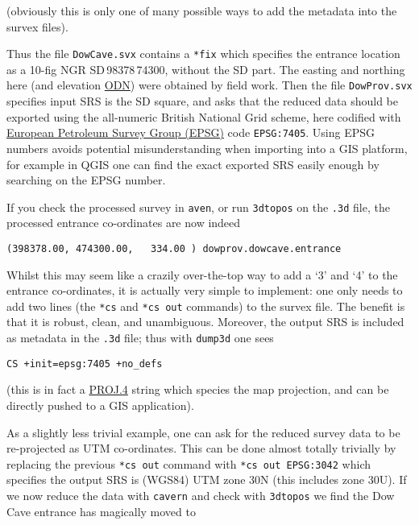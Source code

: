\documentclass[]{article}
\begin{document}
(obviously this is only one of many possible ways to add the metadata
into the survex files).

Thus the file \verb}DowCave.svx} contains a \verb}*fix} which
specifies the entrance location as a 10-fig NGR
SD\,98378\,74300, without the SD part. The easting and
northing here (and elevation
\href{https://en.wikipedia.org/wiki/Ordnance_datum}{ODN}) were obtained
by field work. Then the file \verb}DowProv.svx} specifies input SRS is
the SD square, and asks that the reduced data should be exported
using the all-numeric British National Grid scheme, here codified with 
\href{http://spatialreference.org/}{European Petroleum Survey Group
  (EPSG)} code \verb+EPSG:7405+.
Using EPSG numbers avoids potential misunderstanding when
importing into a GIS platform, for example in QGIS one can find the
exact exported SRS easily enough by searching on the EPSG number.

If you check the processed survey in \verb}aven}, or run
\verb}3dtopos} on the \verb}.3d} file, the processed entrance
co-ordinates are now indeed

\begin{verbatim}
(398378.00, 474300.00,   334.00 ) dowprov.dowcave.entrance
\end{verbatim}

Whilst this may seem like a crazily over-the-top way to add a `3' and
`4' to the entrance co-ordinates, it is actually very simple to
implement: one only needs to add two lines (the \verb}*cs} and
\verb}*cs out} commands) to the survex file. The benefit is that it
is robust, clean, and unambiguous. Moreover, the output SRS is included
as metadata in the \verb}.3d} file; thus with \verb}dump3d} one sees

\begin{verbatim}
CS +init=epsg:7405 +no_defs
\end{verbatim}

(this is in fact a \href{http://proj4.org/}{PROJ.4} string which species
the map projection, and can be directly pushed to a GIS application).

As a slightly less trivial example, one can ask for the reduced survey
data to be re-projected as UTM co-ordinates. This can be done almost
totally trivially by replacing the previous \verb}*cs out} command
with \verb}*cs out EPSG:3042} which specifies the output SRS is
(WGS84) UTM zone 30N (this includes zone 30U). If we now reduce the data
with \verb}cavern} and check with \verb}3dtopos} we find the Dow
Cave entrance has magically moved to
\end{document}

